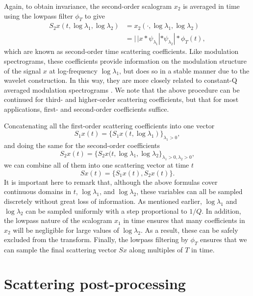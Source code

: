 \documentclass{article}
\newcommand{\lau}{{\lambda_1}}
\newcommand{\lad}{{\lambda_2}}
\begin{document}
\begin{sloppy}
Again, to obtain invariance, the second-order scalogram $x_2$ is averaged in time using the lowpass filter $\phi_T$ to give
\begin{align}
	\nonumber
	S_2 x(t, \log \lau, \log \lad) &= x_2(\cdot, \log \lau, \log \lad) \\
	&= |\,| x \ast \psi_\lau | \ast \psi_\lad | \ast \phi_T(t),
\end{align}
which are known as second-order time scattering coefficients. Like modulation spectrograms, these coefficients provide information on the modulation structure of the signal $x$ at log-frequency $\log \lau$, but does so in a stable manner due to the wavelet construction. In this way, they are more closely related to constant-Q averaged modulation spectrograms \cite{ellis-mcdermott}. We note that the above procedure can be continued for third- and higher-order scattering coefficients, but that for most applications, first- and second-order coefficients suffice.

Concatenating all the first-order scattering coefficients into one vector
\begin{equation}
	S_1x(t) = \{S_1x(t, \log \lau)\}_{\lau>0},
\end{equation}
and doing the same for the second-order coefficients
\begin{equation}
	S_2x(t) = \{S_2x(t, \log \lau, \log \lad\}_{\lau>0, \lad>0},
\end{equation}
we can combine all of them into one scattering vector at time $t$
\begin{equation}
	Sx(t) = \{S_1x(t), S_2x(t)\}.
\end{equation}
It is important here to remark that, although the above formulas cover continuous domains in $t$, $\log \lau$, and $\log \lad$, these variables can all be sampled discretely without great loss of information. As mentioned earlier, $\log \lau$ and $\log \lad$ can be sampled uniformly with a step proportional to $1/Q$. In addition, the lowpass nature of the scalogram $x_1$ in time ensures that many coefficients in $x_2$ will be negligible for large values of $\log \lad$. As a result, these can be safely excluded from the transform. Finally, the lowpass filtering by $\phi_T$ ensures that we can sample the final scattering vector $Sx$ along multiples of $T$ in time.

\section{Scattering post-processing}
\label{sec:post}


\end{sloppy}
\end{document}
